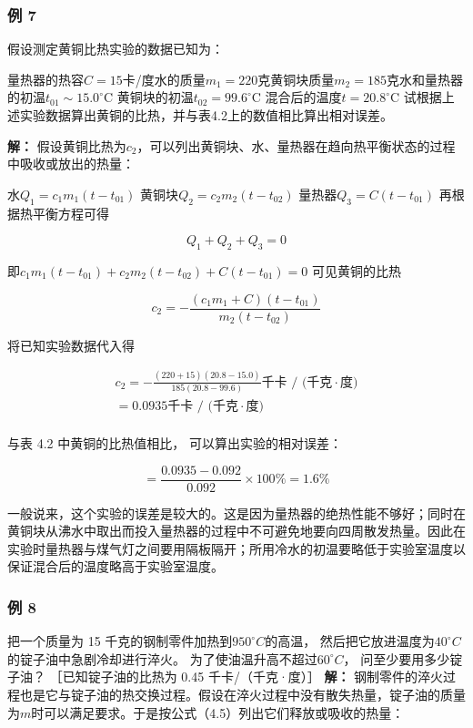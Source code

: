 \subsubsection{例 7}\label{ux4f8b-7-1}

假设测定黄铜比热实验的数据已知为：

量热器的热容\(C = 15\)卡/度水的质量\(m_{1} = 220\)克黄铜块质量\(m_{2} = 185\)克水和量热器的初温\(t_{01} \sim 15.0^{\circ} \mathrm{C}\)
黄铜块的初温\(t_{02} = 99.6^{\circ}\mathrm{C}\)
混合后的温度\(t = 20.8^{\circ}\mathrm{C}\)
试根据上述实验数据算出黄铜的比热，并与表4.2上的数值相比算出相对误差。

\textbf{解：}
假设黄铜比热为\(c_{2}\)，可以列出黄铜块、水、量热器在趋向热平衡状态的过程中吸收或放出的热量：

水\(Q_{1} = c_{1}m_{1}(t - t_{01})\)
黄铜块\(Q_{2} = c_{2}m_{2}(t - t_{02})\) 量热器\(Q_{3} = C(t - t_{01})\)
再根据热平衡方程可得

\[
Q _ {1} + Q _ {2} + Q _ {3} = 0
\]

即\(c_{1}m_{1}(t - t_{01}) + c_{2}m_{2}(t - t_{02}) + C(t - t_{01}) = 0\)
可见黄铜的比热

\[
c_2=-\frac{(c_1m_1+C)(t-t_{01})}{m_2(t-t_{02})}
\]

将已知实验数据代入得

\[
\begin{array}{l} c _ {2} = - \frac {(220 + 15) (20.8 - 15.0)}{185 (20.8 - 99.6)} \text{千卡 / (千克}\mathbin{\cdot}\text{度)} \\ = 0.0935 \text{千卡 / (千克}\mathbin{\cdot}\text{度)} \\ \end{array}
\]

与表 4.2 中黄铜的比热值相比， 可以算出实验的相对误差：

\[
= \frac {0.0935 - 0.092}{0.092} \times 100 \% = 1.6 \%
\]

一般说来，这个实验的误差是较大的。这是因为量热器的绝热性能不够好；同时在黄铜块从沸水中取出而投入量热器的过程中不可避免地要向四周散发热量。因此在实验时量热器与煤气灯之间要用隔板隔开；所用冷水的初温要略低于实验室温度以保证混合后的温度略高于实验室温度。

\subsubsection{例 8}\label{ux4f8b-8-1}

把一个质量为 15 千克的钢制零件加热到\(950^{\circ}C\)的高温，
然后把它放进温度为\(40^{\circ}C\)的锭子油中急剧冷却进行淬火。
为了使油温升高不超过\(60^{\circ}C\)， 问至少要用多少锭子油？
［已知锭子油的比热为 0.45 千卡/（千克·度）］ \textbf{解：}
钢制零件的淬火过程也是它与锭子油的热交换过程。假设在淬火过程中没有散失热量，锭子油的质量为\(m\)时可以满足要求。于是按公式（4.5）列出它们释放或吸收的热量：

